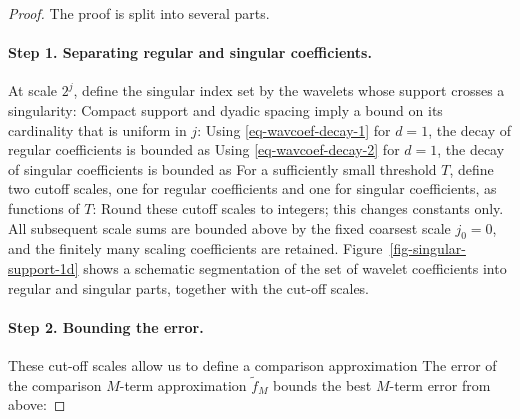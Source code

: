 \begin{proof}
The proof is split into several parts.

\paragraph{Step 1. Separating regular and singular coefficients.}

At scale $2^j$, define the singular index set by the wavelets whose support crosses a singularity:
Compact support and dyadic spacing imply a bound on its cardinality that is uniform in $j$:
Using \eqref{eq-wavcoef-decay-1} for $d=1$, the decay of regular coefficients is bounded as
Using \eqref{eq-wavcoef-decay-2} for $d=1$, the decay of singular coefficients is bounded as
For a sufficiently small threshold $T$, define two cutoff scales, one for regular coefficients and one for singular coefficients, as functions of $T$:
Round these cutoff scales to integers; this changes constants only. All subsequent scale sums are bounded above by the fixed coarsest scale $j_0=0$, and the finitely many scaling coefficients are retained. Figure~\ref{fig-singular-support-1d} shows a schematic segmentation of the set of wavelet coefficients into regular and singular parts, together with the cut-off scales.


\paragraph{Step 2. Bounding the error.}
These cut-off scales allow us to define a comparison approximation
The error of the comparison $M$-term approximation $\tilde f_M$ bounds the best $M$-term error from above:


\end{proof}
